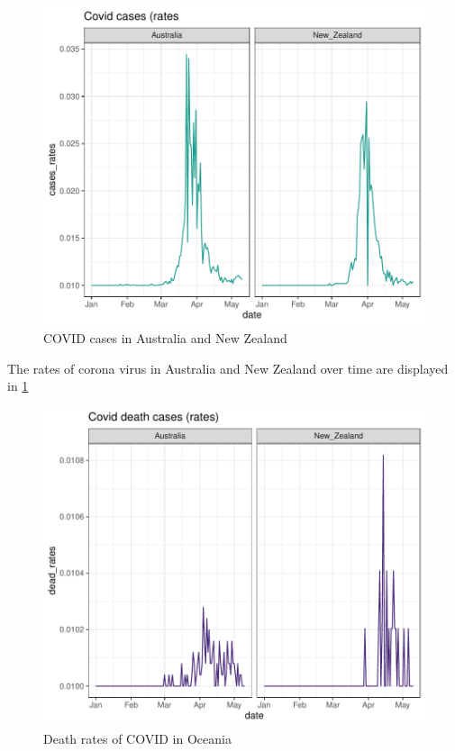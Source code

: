 \documentclass[11pt,a4paper,]{article}
\begin{document}
\begin{figure}

{\centering \includegraphics{Week8_demo_files/figure-latex/oceania-cases-1} 

}

\caption{COVID cases in Australia and New Zealand}\label{fig:oceania-cases}
\end{figure}

The rates of corona virus in Australia and New Zealand over time are displayed in \ref{fig:oceania-cases}

\begin{figure}

{\centering \includegraphics{Week8_demo_files/figure-latex/oceania-death-1} 

}

\caption{Death rates of COVID in Oceania}\label{fig:oceania-death}
\end{figure}
\end{document}
